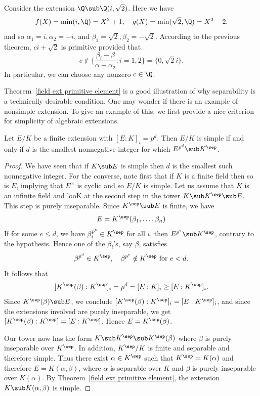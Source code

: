 \begin{example}
Consider the extension $\Q\sub\Q(i,\sqrt{2})$. Here we have
\[f(X)=\min(i,\Q)=X^2+1,\quad g(X)=\min(\sqrt{2},\Q)=X^2-2.\]
and so $\alpha_1=i,\alpha_2=-i$, and $\beta_1=\sqrt{2},\beta_2=-\sqrt{2}$.  According to the previous theorem, $ci+\sqrt{2}$ is primitive provided that
\[c\notin\Big\{\frac{\beta_i-\beta}{\alpha-\alpha_2}:i=1,2\Big\}=\{0,\sqrt{2}i\}.\]
In particular, we can choose any nonzero $c\in\Q$.
\end{example}
Theorem~\ref{field ext primitive element} is a good illustration of why separability is a technically desirable condition. One may wonder if there is an example of nonsimple extension. To give an example of this, we first provide a nice criterion for simplicity of algebraic extensions.
\begin{proposition}\label{field ext finite is simple iff radical exponent}
Let $E/K$ be a finite extension with $[E:K]_i=p^d$. Then $E/K$ is simple if and only if $d$ is the smallest nonnegative integer for which $E^{p^d}\sub K^{\sep}$.
\end{proposition}
\begin{proof}
We have seen that if $K\sub E$ is simple then $d$ is the smallest such nonnegative integer. For the converse, note first that if $K$ is a finite field then so is $E$, implying that $E^\times$ is cyclic and so $E/K$ is simple. Let us assume that $K$ is an infinite field and looK at the second step in the tower $K\sub K^{\sep}\sub E$. This step is purely inseparable. Since $K^{\sep}\sub E$ is finite, we have
\[E=K^{\sep}(\beta_1,\dots,\beta_n)\]
If for some $e\leq d$, we have $\beta_i^{p^e}\in K^{\sep}$ for all $i$, then $E^{p^e}\sub K^{\sep}$, contrary to the hypothesis. Hence one of the $\beta_i$'s, say $\beta$, satisfies
\[\beta^{p^d}\in K^{\sep},\quad \beta^{p^e}\notin K^{\sep}\text{ for }e<d.\]
It follows that
\[[K^{\sep}(\beta):K^{\sep}]_i=p^d=[E:K]_i\geq[E:K^{\sep}]_i.\]
Since $K^{\sep}(\beta)\sub E$, we conclude $[K^{\sep}(\beta):K^{\sep}]_i=[E:K^{\sep}]_i$, and since the extensions involved are purely inseparable, we get $[K^{\sep}(\beta):K^{\sep}]=[E:K^{\sep}]$. Hence $E=K^{\sep}(\beta)$.\par
Our tower now has the form $K\sub K^{\sep}\sub K^{\sep}(\beta)$ where $\beta$ is purely inseparable over $K^{\sep}$. In addition, $K^{\sep}/K$ is finite and separable and therefore simple. Thus there exist $\alpha\in K^{\sep}$ such that $K^{\sep}=K(\alpha)$ and therefore $E=K(\alpha,\beta)$, where $\alpha$ is separable over $K$ and $\beta$ is purely inseparable over $K(\alpha)$. By Theorem~\ref{field ext primitive element}, the extension $K\sub K(\alpha,\beta)$ is simple.
\end{proof}

